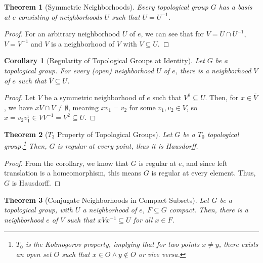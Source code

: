 \documentclass[12pt]{extarticle}
\theoremstyle{plain}
\newtheorem*{theorem}{Theorem}
\newtheorem*{corollary}{Corollary}
\theoremstyle{definition}
\theoremstyle{note}
\begin{document}
\begin{theorem}[Symmetric Neighborhoods]
  Every topological group $G$ has a basis at $e$ consisting of neighborhoods $U$ such that $U = U^{-1}$.
\end{theorem}
\begin{proof}
  For an arbitrary neighborhood $U$ of $e$, we can see that for $V = U\cap U^{-1}$, $V = V^{-1}$ and $V$ is a neighborhood of $V$ with $V\subseteq U$.
\end{proof}
\begin{corollary}[Regularity of Topological Groups at Identity]
  Let $G$ be a topological group. For every (open) neighborhood $U$ of $e$, there is a neighborhood $V$ of $e$ such that $\overline{V} \subseteq U$.
\end{corollary}
\begin{proof}
  Let $V$ be a symmetric neighborhood of $e$ such that $V^{2}\subseteq U$. Then, for $x\in \overline{V}$, we have $xV \cap V \neq \emptyset$, meaning $xv_1 = v_2$ for some $v_1,v_2 \in V$, so $x = v_2v_1^{_1}\in VV^{-1} = V^2 \subseteq U$.
\end{proof}
\begin{theorem}[$T_3$ Property of Topological Groups]
  Let $G$ be a $T_0$ topological group.\footnote{$T_0$ is the Kolmogorov property, implying that for two points $x\neq y$, there exists an open set $O$ such that $x\in O\wedge y\notin O$ or vice versa.} Then, $G$ is regular at every point, thus it is Hausdorff.
\end{theorem}
\begin{proof}
  From the corollary, we know that $G$ is regular at $e$, and since left translation is a homeomorphism, this means $G$ is regular at every element. Thus, $G$ is Hausdorff.
\end{proof}
\begin{theorem}[Conjugate Neighborhoods in Compact Subsets]
  Let $G$ be a topological group, with $U$ a neighborhood of $e$, $F \subseteq G$ compact. Then, there is a neighborhood $e$ of $V$ such that $xVx^{-1} \subseteq U$ for all $x\in F$.
\end{theorem}
\end{document}
